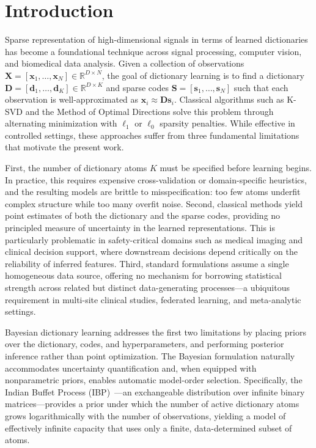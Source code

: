 \documentclass[11pt,a4paper]{article}
\theoremstyle{definition}
\begin{document}
\section{Introduction}

Sparse representation of high-dimensional signals in terms of learned dictionaries has become a foundational technique across signal processing, computer vision, and biomedical data analysis. Given a collection of observations $\mathbf{X} = [\mathbf{x}_1, \ldots, \mathbf{x}_N] \in \mathbb{R}^{D \times N}$, the goal of dictionary learning is to find a dictionary $\mathbf{D} = [\mathbf{d}_1, \ldots, \mathbf{d}_K] \in \mathbb{R}^{D \times K}$ and sparse codes $\mathbf{S} = [\mathbf{s}_1, \ldots, \mathbf{s}_N]$ such that each observation is well-approximated as $\mathbf{x}_i \approx \mathbf{D}\mathbf{s}_i$. Classical algorithms such as K-SVD and the Method of Optimal Directions solve this problem through alternating minimization with $\ell_1$ or $\ell_0$ sparsity penalties. While effective in controlled settings, these approaches suffer from three fundamental limitations that motivate the present work.

First, the number of dictionary atoms $K$ must be specified before learning begins. In practice, this requires expensive cross-validation or domain-specific heuristics, and the resulting models are brittle to misspecification: too few atoms underfit complex structure while too many overfit noise. Second, classical methods yield point estimates of both the dictionary and the sparse codes, providing no principled measure of uncertainty in the learned representations. This is particularly problematic in safety-critical domains such as medical imaging and clinical decision support, where downstream decisions depend critically on the reliability of inferred features. Third, standard formulations assume a single homogeneous data source, offering no mechanism for borrowing statistical strength across related but distinct data-generating processes---a ubiquitous requirement in multi-site clinical studies, federated learning, and meta-analytic settings.

Bayesian dictionary learning addresses the first two limitations by placing priors over the dictionary, codes, and hyperparameters, and performing posterior inference rather than point optimization. The Bayesian formulation naturally accommodates uncertainty quantification and, when equipped with nonparametric priors, enables automatic model-order selection. Specifically, the Indian Buffet Process (IBP)~\citep{griffiths2011}---an exchangeable distribution over infinite binary matrices---provides a prior under which the number of active dictionary atoms grows logarithmically with the number of observations, yielding a model of effectively infinite capacity that uses only a finite, data-determined subset of atoms.
\end{document}
